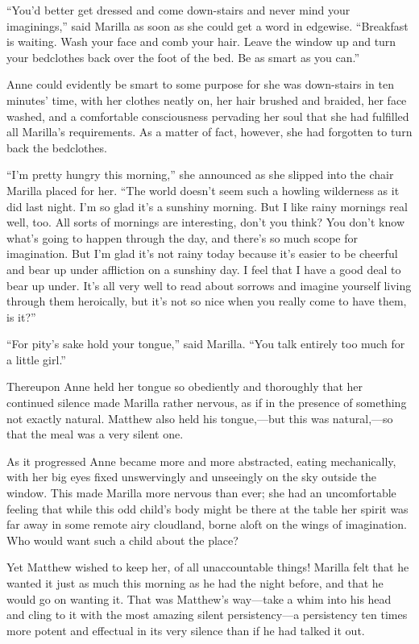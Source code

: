 \documentclass[a4paper]{article}
\begin{document}
``You'd better get dressed and come down-stairs and never mind your imaginings,'' said Marilla as soon as she could get a word in edgewise. ``Breakfast is waiting. Wash your face and comb your hair. Leave the window up and turn your bedclothes back over the foot of the bed. Be as smart as you can.''

Anne could evidently be smart to some purpose for she was down-stairs in ten minutes' time, with her clothes neatly on, her hair brushed and braided, her face washed, and a comfortable consciousness pervading her soul that she had fulfilled all Marilla's requirements. As a matter of fact, however, she had forgotten to turn back the bedclothes.

``I'm pretty hungry this morning,'' she announced as she slipped into the chair Marilla placed for her. ``The world doesn't seem such a howling wilderness as it did last night. I'm so glad it's a sunshiny morning. But I like rainy mornings real well, too. All sorts of mornings are interesting, don't you think? You don't know what's going to happen through the day, and there's so much scope for imagination. But I'm glad it's not rainy today because it's easier to be cheerful and bear up under affliction on a sunshiny day. I feel that I have a good deal to bear up under. It's all very well to read about sorrows and imagine yourself living through them heroically, but it's not so nice when you really come to have them, is it?''

``For pity's sake hold your tongue,'' said Marilla. ``You talk entirely too much for a little girl.''

Thereupon Anne held her tongue so obediently and thoroughly that her continued silence made Marilla rather nervous, as if in the presence of something not exactly natural. Matthew also held his tongue,---but this was natural,---so that the meal was a very silent one.

As it progressed Anne became more and more abstracted, eating mechanically, with her big eyes fixed unswervingly and unseeingly on the sky outside the window. This made Marilla more nervous than ever; she had an uncomfortable feeling that while this odd child's body might be there at the table her spirit was far away in some remote airy cloudland, borne aloft on the wings of imagination. Who would want such a child about the place?

Yet Matthew wished to keep her, of all unaccountable things! Marilla felt that he wanted it just as much this morning as he had the night before, and that he would go on wanting it. That was Matthew's way---take a whim into his head and cling to it with the most amazing silent persistency---a persistency ten times more potent and effectual in its very silence than if he had talked it out.
\end{document}
